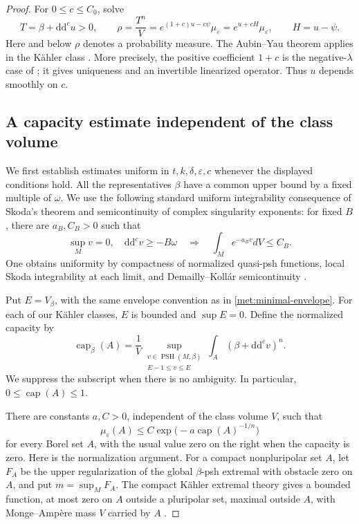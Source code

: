\documentclass[11pt,letterpaper]{article}
\newcommand{\ddc}{\mathrm{d}\mathrm{d}^{c}}
\theoremstyle{definition}
\theoremstyle{remark}
\begin{document}
\begin{proof}
For \(0\leq c\leq C_0\), solve
\begin{equation}
 \label{met:ma-family}
 T=\beta+\ddc u>0,
 \qquad
 \rho=\frac{T^n}{V}
   =e^{(1+c)u-c\psi}\mu_\varepsilon
   =e^{u+cH}\mu_\varepsilon,
 \qquad H=u-\psi.
\end{equation}
Here and below \(\rho\) denotes a probability measure.  The
Aubin--Yau theorem applies in the K\"ahler class
\cite{AubinMongeAmpere,YauCalabi}.  More precisely, the positive
coefficient \(1+c\) is the negative-\(\lambda\) case of
\cite[Theorem 7.14]{AubinBook1998}; it gives uniqueness and an
invertible linearized operator.  Thus \(u\) depends smoothly on \(c\).

\subsection*{A capacity estimate independent of the class volume}

We first establish estimates uniform in \(t,k,\delta,\varepsilon,c\)
whenever the displayed conditions hold.  All the representatives
\(\beta\) have a common upper bound by a fixed multiple of \(\omega\).
We use the following standard uniform integrability consequence of
Skoda's theorem and semicontinuity of complex singularity exponents:
for fixed \(B\), there are \(a_B,C_B>0\) such that
\begin{equation}
 \label{met:uniform-skoda}
 \sup_M v=0,\quad \ddc v\geq-B\omega
 \quad\Longrightarrow\quad
 \int_M e^{-a_Bv}dV\leq C_B.
\end{equation}
One obtains uniformity by compactness of normalized quasi-psh
functions, local Skoda integrability at each limit, and
Demailly--Koll\'ar semicontinuity
\cite{SkodaIntegrability,DemaillyKollar}.

Put \(E=V_\beta\), with the same envelope convention as in
\eqref{met:minimal-envelope}.  For each of our K\"ahler classes, \(E\)
is bounded and \(\sup E=0\).  Define the normalized capacity by
\begin{equation}
 \label{met:capacity}
 \operatorname{cap}_\beta(A)
 =\frac1V\sup_{\substack{v\in\operatorname{PSH}(M,\beta)\\E-1\leq v\leq E}}
       \int_A(\beta+\ddc v)^n.
\end{equation}
We suppress the subscript when there is no ambiguity.  In particular,
\(0\leq\operatorname{cap}(A)\leq1\).

There are constants \(a,C>0\), independent of the class volume \(V\),
such that
\begin{equation}
 \label{met:exponential-capacity}
 \mu_\varepsilon(A)
 \leq C\exp\bigl(-a\operatorname{cap}(A)^{-1/n}\bigr)
\end{equation}
for every Borel set \(A\), with the usual value zero on the right when
the capacity is zero.  Here is the normalization argument.  For a
compact nonpluripolar set \(A\), let \(F_A\) be the upper regularization
of the global \(\beta\)-psh extremal with obstacle zero on \(A\), and
put \(m=\sup_M F_A\).  The compact K\"ahler extremal theory gives a
bounded function, at most zero on \(A\) outside a pluripolar set,
maximal outside \(A\), with Monge--Amp\`ere mass \(V\) carried by \(A\)
\cite[Sections 5--7]{GuedjZeriahiCapacity}.


\end{proof}
\end{document}
